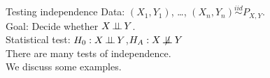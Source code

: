 \documentclass[dvipsnames,aspectratio=169]{beamer} %
\newcommand{\R}{\mathbb{R}}
\newcommand{\indep}{\mbox{\,$\perp\!\!\!\perp$\,}}
\begin{document}



\begin{frame}{Testing independence}
Data: $(X_1,Y_1)$, \ldots, $(X_n,Y_n)\overset{iid}{\sim}P_{X,Y}$.\\[.3cm]
Goal: Decide whether $X\indep Y$.\\[.3cm]
Statistical test: \qquad $H_0:X\indep Y$,\quad $H_A:X\indep\!\!\!\!\!\!\!\!\not\;\;\; Y$\\[.7cm]
There are many tests of independence.\\[.3cm]
We discuss some examples.
\end{frame}
\end{document}
